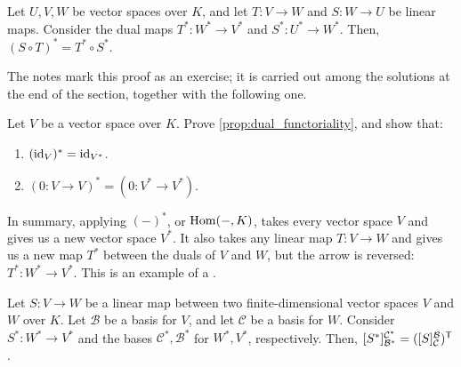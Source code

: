 \begin{proposition}
  \label{prop:dual_functoriality}
  Let $U, V, W$ be vector spaces over $K$, and let $T \colon V \to W$ and $S \colon W \to U$ be linear maps. Consider the dual maps $T^* \colon W^* \to V^*$ and $S^* \colon U^* \to W^*$. Then, $(S \circ T)^* = T^* \circ S^*$.
\end{proposition}

The notes mark this proof as an exercise; it is carried out among the solutions at the end of the section, together with the following one.

\begin{exercise}
  \label{exc:dual_functoriality}
  Let $V$ be a vector space over $K$. Prove \cref{prop:dual_functoriality}, and show that:
  \begin{enumerate}[label=\textbf{(\alph*)}]
    \item $(\operatorname{id}_V)^* = \operatorname{id}_{V^*}$.
    \item $(0 \colon V \to V)^* = (0 \colon V^* \to V^*)$.
  \end{enumerate}
\end{exercise}


\begin{summary}
In summary, applying $(-)^*$, or $\operatorname{Hom}(-,K)$, takes every vector space $V$ and gives us a new vector space $V^*$. It also takes any linear map $T \colon V \to W$ and gives us a new map $T^*$ between the duals of $V$ and $W$, but the arrow is reversed: $T^* \colon W^* \to V^*$. This is an example of a .
\end{summary}

\begin{lemma}
  \label{lem:dual_map_transpose}
  Let $S \colon V \to W$ be a linear map between two finite-di\-men\-sional vector spaces $V$ and $W$ over $K$. Let $\mathcal{B}$ be a basis for $V$, and let $\mathcal{C}$ be a basis for $W$. Consider $S^* \colon W^* \to V^*$ and the bases $\mathcal{C}^*, \mathcal{B}^*$ for $W^*, V^*$, respectively. Then, $[S^*]_{\mathcal{B}^*}^{\mathcal{C}^*} = ([S]_{\mathcal{C}}^{\mathcal{B}})^{\mathsf{T}}$.
\end{lemma}

